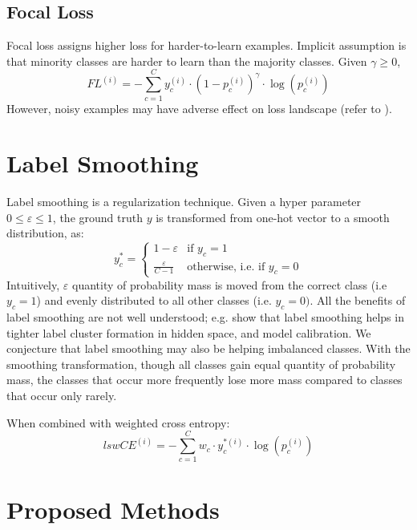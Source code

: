 \subsection{Focal Loss}
\label{sec:focal-loss}
 Focal loss \cite{lin-etal-2020-focalloss} assigns higher loss for harder-to-learn examples.
 Implicit assumption is that minority classes are harder to learn than the majority classes.
Given $\gamma \ge 0$,
\begin{equation}
    FL^{(i)} = -\sum^C_{c=1} y^{(i)}_c \cdot (1-p^{(i)}_c)^\gamma \cdot \log(p^{(i)}_c) 
\end{equation}
However, noisy examples may have adverse effect on loss landscape (refer to \citet{cui2019effective-samples}).

\section{Label Smoothing}
\label{sec:label-smooth}
Label smoothing \cite{szegedy2016re-inception} is a regularization technique.
Given a hyper parameter $0 \le \varepsilon \le 1$, the ground truth $y$ is transformed from one-hot vector to a smooth distribution, as:
\begin{equation}
    y_c^* = \begin{cases}
     1-\varepsilon & \text{if } y_c = 1 \\
     \frac{\varepsilon}{C-1} & \text{otherwise, i.e. if } y_c=0
    \end{cases}
\label{eqn:label_smooth}
\end{equation}
Intuitively, $\varepsilon$ quantity of probability mass is moved from the correct class (i.e $y_c=1$) and evenly distributed to all other classes (i.e. $y_c=0)$.
All the benefits of label smoothing are not well understood; e.g. \citet{muller-2019-when-labelsmooth} show that label smoothing helps in tighter label cluster formation in hidden space, and model calibration.
We conjecture that label smoothing may also be helping imbalanced classes. 
With the smoothing transformation, though all classes gain equal quantity of probability mass, the classes that occur more frequently lose more mass compared to classes that occur only rarely. 

When combined with weighted cross entropy:
\begin{equation}
 lswCE^{(i)} = -\sum^C_{c=1} w_c \cdot y^{*(i)}_c \cdot \log(p^{(i)}_c)
\end{equation}


\section{Proposed Methods}

